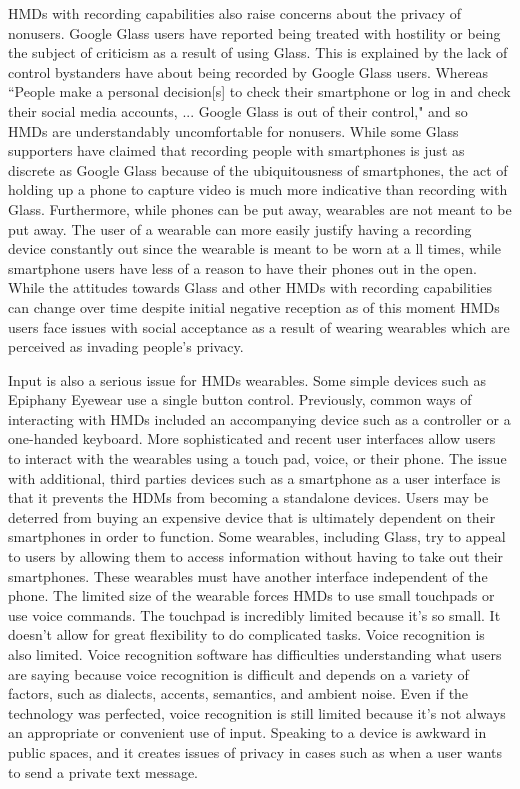 \documentclass[11pt]{article}
\begin{document}
HMDs with recording capabilities also raise concerns about the privacy of nonusers. Google Glass users have reported being treated with hostility or being the subject of criticism as a result of using Glass\cite{negativeGlassReactions}\cite{fromCyborgsToGG}. This is explained by the lack of control bystanders have about being recorded by Google Glass users. Whereas ``People make a personal decision[s] to check their smartphone or log in and check their social media accounts, ... Google Glass is out of their control," and so HMDs are understandably uncomfortable for nonusers. While some Glass supporters have claimed that recording people with smartphones is just as discrete as Google Glass because of the ubiquitousness of smartphones, the act of holding up a phone to capture video is much more indicative than recording with Glass. Furthermore, while phones can be put away, wearables are not meant to be put away. The user of a wearable can more easily justify having a recording device constantly out since the wearable is meant to be worn at a ll times, while smartphone users have less of a reason to have their phones out in the open. While the attitudes towards Glass and other HMDs with recording capabilities can change over time despite initial negative reception\cite{changingAttitudes} as of this moment HMDs users face issues with social acceptance as a result of wearing wearables which are perceived as invading people's privacy.

Input is also a serious issue for HMDs wearables. Some simple devices such as Epiphany Eyewear use a single button control. Previously, common ways of interacting with HMDs included an accompanying device such as a controller or a one-handed keyboard\cite{inputForHDMs}. More sophisticated and recent user interfaces allow users to interact with the wearables using a  touch pad, voice, or their phone\cite{glassHelp}\cite{userInteractionMultipleDisplays}\cite{inputForHDMs}. The issue with additional, third parties devices such as a smartphone as a user interface is that it prevents the HDMs from becoming a standalone devices. Users may be deterred from buying an expensive device that is ultimately dependent on their smartphones in order to function. Some wearables, including Glass, try to appeal to users by allowing them to access information without having to take out their smartphones. These wearables must have another interface independent of the phone. The limited size of the wearable forces HMDs to use small touchpads or use voice commands. The touchpad is incredibly limited because it's so small. It doesn't allow for great flexibility to do complicated tasks. Voice recognition is also limited. Voice recognition software has difficulties understanding what users are saying because voice recognition is difficult and depends on a variety of factors, such as dialects, accents, semantics, and ambient noise\cite{voiceRecognitionTroubles}. Even if the technology was perfected, voice recognition is still limited because it's not always an appropriate or convenient use of input. Speaking to a device is awkward in public spaces, and it creates issues of privacy in cases such as when a user wants to send a private text message.
\end{document}
